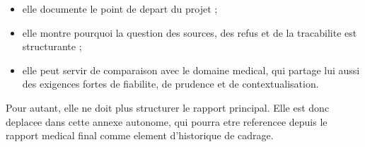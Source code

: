 \documentclass[11pt,a4paper]{article}
\begin{document}
\begin{itemize}
  \item elle documente le point de depart du projet ;
  \item elle montre pourquoi la question des sources, des refus et de la tracabilite est structurante ;
  \item elle peut servir de comparaison avec le domaine medical, qui partage lui aussi des exigences fortes de fiabilite, de prudence et de contextualisation.
\end{itemize}

Pour autant, elle ne doit plus structurer le rapport principal. Elle est donc deplacee dans cette annexe autonome, qui pourra etre referencee depuis le rapport medical final comme element d'historique de cadrage.

\printbibliography
\end{document}
